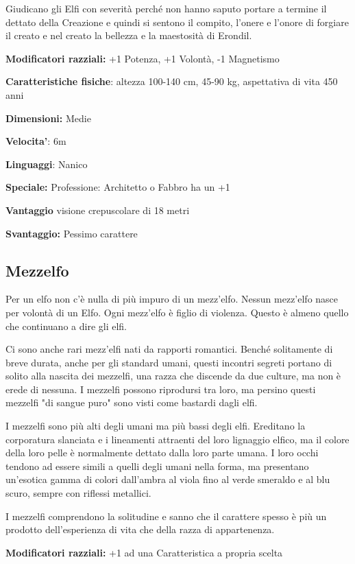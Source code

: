 \documentclass[a4paper,11pt,twoside,openany]{book}
\begin{document}
Giudicano gli Elfi con severità perché non hanno saputo portare a termine il dettato della Creazione e quindi si sentono il compito, l'onere e l'onore di forgiare il creato e nel creato la bellezza e la maestosità di Erondil.

\textbf{Modificatori razziali:} +1 Potenza, +1 Volontà, -1 Magnetismo

\textbf{Caratteristiche fisiche}: altezza 100-140 cm, 45-90 kg, aspettativa
di vita 450 anni

\textbf{Dimensioni:} Medie

\textbf{Velocita'}: 6m

\textbf{Linguaggi}: Nanico

\textbf{Speciale:} Professione: Architetto o Fabbro ha un +1

\textbf{Vantaggio} visione crepuscolare di 18 metri

\textbf{Svantaggio:} Pessimo carattere

\subsection{Mezzelfo}

\label{mezzelfo}

Per un elfo non c'è nulla di più impuro di un mezz'elfo. Nessun mezz'elfo nasce per volontà di un Elfo. Ogni mezz'elfo è figlio di violenza. Questo è almeno quello che continuano a dire gli elfi.

Ci sono anche rari mezz'elfi nati da rapporti romantici. Benché solitamente di breve durata, anche per gli standard umani, questi incontri segreti portano di solito alla nascita dei mezzelfi, una razza che discende da due culture, ma non è erede di nessuna. I mezzelfi possono riprodursi tra loro, ma persino questi mezzelfi "di sangue puro" sono visti come bastardi dagli elfi.

I mezzelfi sono più alti degli umani ma più bassi degli elfi. Ereditano la corporatura slanciata e i lineamenti attraenti del loro lignaggio elfico, ma il colore della loro pelle è normalmente dettato dalla loro parte umana. I loro occhi tendono ad essere simili a quelli degli umani nella forma, ma presentano un'esotica gamma di colori dall'ambra al viola fino al verde smeraldo e al blu scuro, sempre con riflessi metallici.

I mezzelfi comprendono la solitudine e sanno che il carattere spesso è più un prodotto dell'esperienza di vita che della razza di appartenenza.

\textbf{Modificatori razziali:} +1 ad una Caratteristica a propria
scelta
\end{document}
